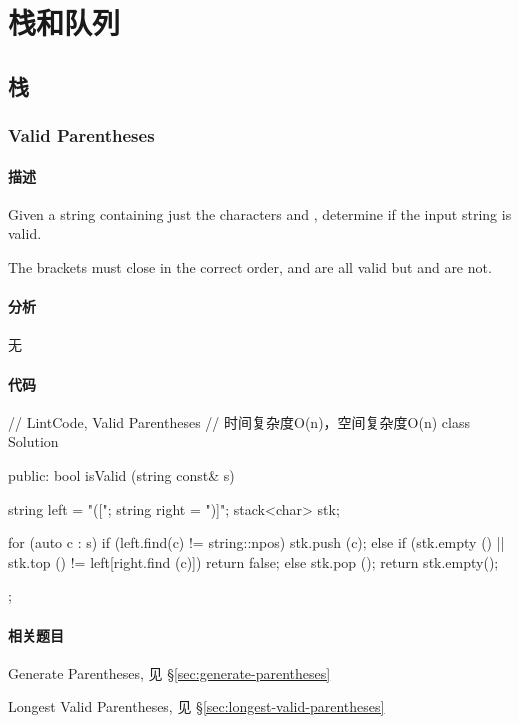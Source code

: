 \chapter{栈和队列}


\section{栈} %


\subsection{Valid Parentheses} %
\label{sec:valid-parentheses}


\subsubsection{描述}
Given a string containing just the characters \code{'(', ')', '\{', '\}', '['} and \code{']'}, determine if the input string is valid.

The brackets must close in the correct order,  and  are all valid but \code{"(]"} and  are not.


\subsubsection{分析}
无


\subsubsection{代码}
\begin{Code}
// LintCode, Valid Parentheses
// 时间复杂度O(n)，空间复杂度O(n)
class Solution {
public:
    bool isValid (string const& s) {
        string left = "([{";
        string right = ")]}";
        stack<char> stk;

        for (auto c : s) {
            if (left.find(c) != string::npos) {
                stk.push (c);
            } else {
                if (stk.empty () || stk.top () != left[right.find (c)])
                    return false;
                else
                    stk.pop ();
            }
        }
        return stk.empty();
    }
};
\end{Code}


\subsubsection{相关题目}
\begindot
\item Generate Parentheses, 见 \S \ref{sec:generate-parentheses}
\item Longest Valid Parentheses, 见 \S \ref{sec:longest-valid-parentheses}
\myenddot


